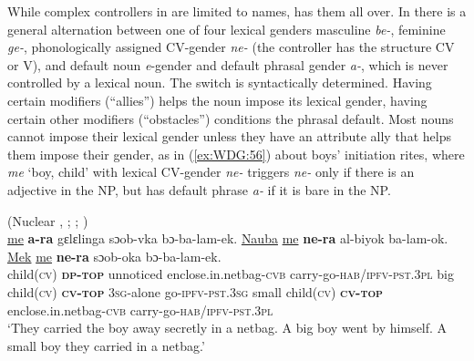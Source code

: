 \documentclass[output=collectionpaper]{langsci/langscibook}
\begin{document}
While complex controllers in  are limited to names,  has them all over. In  there is a general alternation between one of four lexical genders \textendash{} masculine \textit{be-}, feminine \textit{ge-}, phonologically assigned CV-gender \textit{ne-} (the controller has the structure CV or V), and default noun \textit{e}-gender \textendash{} and default phrasal gender \textit{a-}, which is never controlled by a lexical noun. The switch is syntactically determined. Having certain modifiers (``allies'') helps the noun impose its lexical gender, having certain other modifiers (``obstacles'') conditions the phrasal default. Most nouns cannot impose their lexical gender unless they have an attribute ally that helps them impose their gender, as in (\ref{ex:WDG:56}) about boys' initiation rites, where \textit{me} `boy, child' with lexical CV-gender \textit{ne-} triggers \textit{ne-} only if there is an adjective in the NP, but has default phrase \textit{a-} if it is bare in the NP.

\ea\label{ex:WDG:56}
 (Nuclear , ; \citealt{Binzellnd}{}; \citealt[71]{Waelchli2018})\\
\gll \uline{me}	\textbf{a-ra}	gɛlɛlinga	sɔob-vka	bɔ-ba-lam-ek. \uline{Nauba}	\uline{me}	\textbf{ne-ra}	al-biyok	ba-lam-ok.	\uline{Mek}	\uline{me}	\textbf{ne-ra}	sɔob-oka	bɔ-ba-lam-ek.\\
child(\textsc{cv})	\textbf{\textsc{dp-top}}	unnoticed	enclose.in.netbag-\textsc{cvb}	carry-go-\textsc{hab/ipfv-pst.3pl} big	child(\textsc{cv})	\textbf{\textsc{cv-top}}	\textsc{3sg}-alone	go-\textsc{ipfv-pst.3sg} small	child(\textsc{cv})	\textbf{\textsc{cv-top}}	enclose.in.netbag-\textsc{cvb}	carry-go-\textsc{hab/ipfv-pst.3pl}\\
\glt `They carried the boy away secretly in a netbag. A big boy went by himself. A small boy they carried in a netbag.'\\
\z
\end{document}
